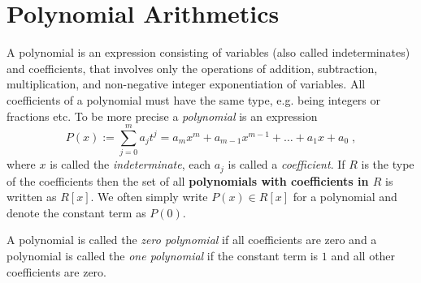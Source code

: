 \section{Polynomial Arithmetics}
A polynomial is an expression consisting of variables (also called indeterminates) and coefficients, that involves only the operations of addition, subtraction, multiplication, and non-negative integer exponentiation of variables. All coefficients of a polynomial must have the same type, e.g. being integers or fractions etc. To be more precise a \textit{polynomial} is an expression
\begin{equation}
P(x) := \sum _{j = 0} ^{m}{a} _{j}{t} ^{j} ={a} _{m}x^m +{a} _{m-1} x^{m-1} + \dots + a_1 x + a_0 \;,
\end{equation}
where $x$ is called the \textit{indeterminate}, each $ a_j$ is called a \textit{coefficient}. If $R$ is the type of the coefficients then the set of all \textbf{polynomials with coefficients in $R$} is written as $R[x]$. We often simply write $ P (x) \in R[x]$ for a polynomial and denote the constant term as $ P(0)$. 

A polynomial is called the \textit{zero polynomial} if all coefficients are zero and a polynomial is called the \textit{one polynomial} if the constant term is $1$ and all other coefficients are zero.

